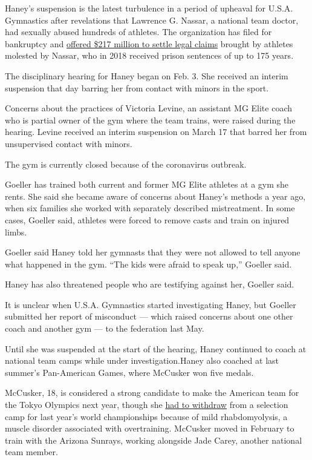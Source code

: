 Haney's suspension is the latest turbulence in a period of upheaval for
U.S.A. Gymnastics after revelations that Lawrence G. Nassar, a national
team doctor, had sexually abused hundreds of athletes. The organization
has filed for bankruptcy and
\href{https://www.nytimes.com/2020/01/30/sports/USA-gymnastics-nassar.html}{offered
\$217 million to settle legal claims} brought by athletes molested by
Nassar, who in 2018 received prison sentences of up to 175 years.

The disciplinary hearing for Haney began on Feb. 3. She received an
interim suspension that day barring her from contact with minors in the
sport.

Concerns about the practices of Victoria Levine, an assistant MG Elite
coach who is partial owner of the gym where the team trains, were raised
during the hearing. Levine received an interim suspension on March 17
that barred her from unsupervised contact with minors.

The gym is currently closed because of the coronavirus outbreak.

Goeller has trained both current and former MG Elite athletes at a gym
she rents. She said she became aware of concerns about Haney's methods a
year ago, when six families she worked with separately described
mistreatment. In some cases, Goeller said, athletes were forced to
remove casts and train on injured limbs.

Goeller said Haney told her gymnasts that they were not allowed to tell
anyone what happened in the gym. ``The kids were afraid to speak up,''
Goeller said.

Haney has also threatened people who are testifying against her, Goeller
said.

It is unclear when U.S.A. Gymnastics started investigating Haney, but
Goeller submitted her report of misconduct --- which raised concerns
about one other coach and another gym --- to the federation last May.

Until she was suspended at the start of the hearing, Haney continued to
coach at national team camps while under investigation.Haney also
coached at last summer's Pan-American Games, where McCusker won five
medals.

McCusker, 18, is considered a strong candidate to make the American team
for the Tokyo Olympics next year, though she
\href{https://twitter.com/usagym/status/1175505704184090626?lang=en}{had
to withdraw} from a selection camp for last year's world championships
because of mild rhabdomyolysis, a muscle disorder associated with
overtraining. McCusker moved in February to train with the Arizona
Sunrays, working alongside Jade Carey, another national team member.

